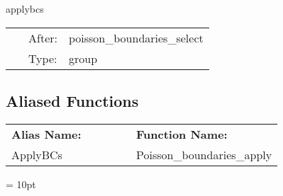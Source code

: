 \vspace{5mm}


\hspace{5mm} applybcs 

\hspace{5mm}{\it apply boundary conditions to initial data } 


\hspace{5mm}

 \begin{tabular*}{160mm}{cll} 
~ & After:  & poisson\_boundaries\_select \\ 
~ & Type:  & group \\ 
\end{tabular*} 


\subsection*{Aliased Functions}

\hspace{5mm}

 \begin{tabular*}{160mm}{ll} 

{\bf Alias Name:} ~~~~~~~ & {\bf Function Name:} \\ 
ApplyBCs & Poisson\_boundaries\_apply \\ 
\end{tabular*} 



\vspace{5mm}\parskip = 10pt 
